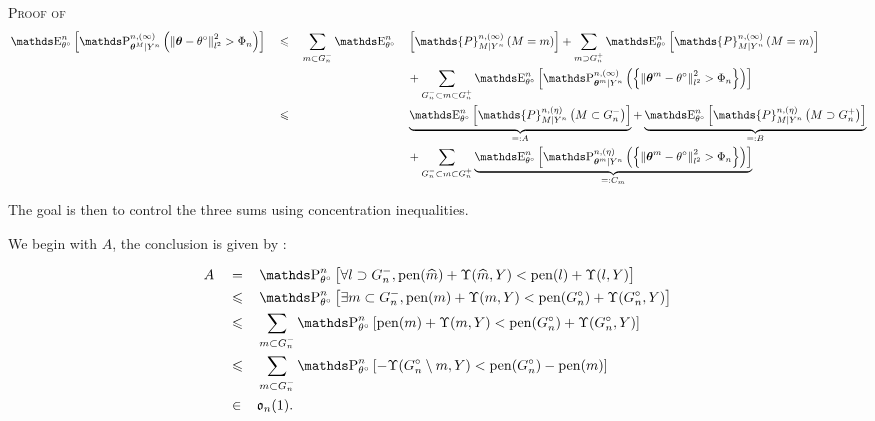 \begin{pro}{\textsc{Proof of } \\}
\begin{alignat*}{4}
& \E_{\theta^{\circ}}^{n}\left[\P^{n, (\infty)}_{\boldsymbol{\theta}^{M} \vert Y^{n}}\left(\left\Vert  \boldsymbol{\theta} - \theta^{\circ}\right\Vert_{l^{2}}^{2} > \Phi_{n} \right)\right] && \leq && \sum\limits_{m \subset G^{-}_{n}}\E_{\theta^{\circ}}^{n} &&\left[\mathds{P}_{M \vert Y^{n}}^{n, (\infty)}\left(M = m\right)\right] + \sum\limits_{m \supset G^{+}_{n}}\E_{\theta^{\circ}}^{n}\left[\mathds{P}_{M \vert Y^{n}}^{n, (\infty)}\left(M = m\right)\right]\\
& && && && +  \sum\limits_{G^{-}_{n} \subset m \subset G^{+}_{n}}\E_{\theta^{\circ}}^{n}\left[\P^{n, (\infty)}_{\boldsymbol{\theta}^{m} \vert Y^{n}}\left(\left\{\left\Vert  \boldsymbol{\theta}^{m} - \theta^{\circ}\right\Vert_{l^{2}}^{2} > \Phi_{n}\right\}\right)\right]\\
& && \leq && &&\underbrace{\E_{\theta^{\circ}}^{n}\left[\mathds{P}_{M \vert Y^{n}}^{n, (\eta)}\left(M \subset G^{-}_{n}\right)\right]}_{=: A} + \underbrace{\E_{\theta^{\circ}}^{n}\left[\mathds{P}_{M \vert Y^{n}}^{n, (\eta)}\left(M \supset G^{+}_{n}\right)\right]}_{=: B}\\
& && && && +  \sum\limits_{G^{-}_{n} \subset m \subset G^{+}_{n}}\underbrace{\E_{\theta^{\circ}}^{n}\left[\P^{n, (\eta)}_{\boldsymbol{\theta}^{m} \vert Y^{n}}\left(\left\{\left\Vert  \boldsymbol{\theta}^{m} - \theta^{\circ}\right\Vert_{l^{2}}^{2} > \Phi_{n}\right\}\right)\right]}_{=:C_{m}}
\end{alignat*}

The goal is then to control the three sums using concentration inequalities.

We begin with $A$, the conclusion is given by :

\begin{alignat*}{3}
& A && = && \P_{\theta^{\circ}}^{n}\left[ \forall l \supset G^{-}_{n}, \pen(\widehat{m}) + \Upsilon(\widehat{m}, Y) < \pen(l) + \Upsilon(l, Y) \right]\\
& && \leq && \P_{\theta^{\circ}}^{n}\left[ \exists m \subset G^{-}_{n}, \pen(m) + \Upsilon(m, Y) < \pen(G^{\circ}_{n}) + \Upsilon(G^{\circ}_{n}, Y) \right]\\
& && \leq && \sum\limits_{m \subset G^{-}_{n}}\P_{\theta^{\circ}}^{n}\left[\pen(m) + \Upsilon(m, Y) < \pen(G^{\circ}_{n}) + \Upsilon(G^{\circ}_{n}, Y) \right]\\
& && \leq && \sum\limits_{m \subset G^{-}_{n}}\P_{\theta^{\circ}}^{n}\left[- \Upsilon(G^{\circ}_{n} \setminus m, Y) < \pen(G^{\circ}_{n}) - \pen(m)\right]\\
& && \in && \mathfrak{o}_{n}(1).
\end{alignat*}


\end{pro}
